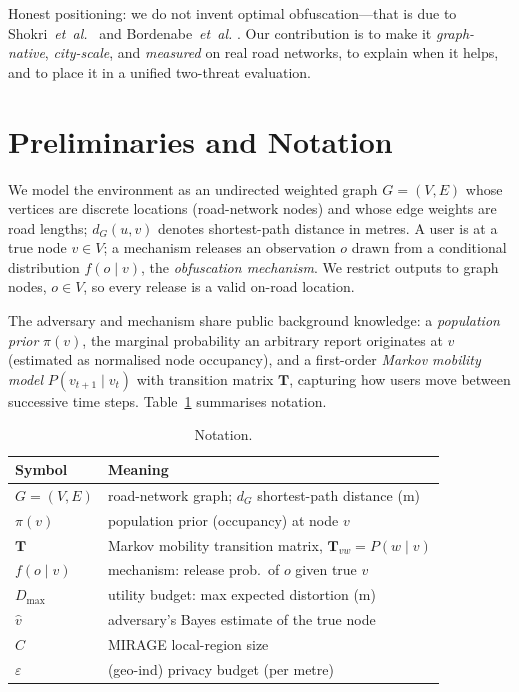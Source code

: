 \documentclass[11pt]{article}
\newcommand{\dG}{d_{G}}
\begin{document}
Honest positioning: we do not invent optimal obfuscation---that is due to
Shokri~\emph{et~al.}~\cite{shokri2012,shokri2015pets} and Bordenabe~\emph{et~al.}
\cite{bordenabe2014}. Our contribution is to make it \emph{graph-native},
\emph{city-scale}, and \emph{measured} on real road networks, to explain when it
helps, and to place it in a unified two-threat evaluation.

\section{Preliminaries and Notation}
\label{sec:prelim}
We model the environment as an undirected weighted graph $G=(V,E)$ whose vertices
are discrete locations (road-network nodes) and whose edge weights are road
lengths; $\dG(u,v)$ denotes shortest-path distance in metres. A user is at a true
node $v\in V$; a mechanism releases an observation $o$ drawn from a conditional
distribution $f(o\mid v)$, the \emph{obfuscation mechanism}. We restrict outputs
to graph nodes, $o\in V$, so every release is a valid on-road location.

The adversary and mechanism share public background knowledge: a \emph{population
prior} $\pi(v)$, the marginal probability an arbitrary report originates at $v$
(estimated as normalised node occupancy), and a first-order \emph{Markov mobility
model} $P(v_{t+1}\mid v_t)$ with transition matrix $\mathbf{T}$, capturing how
users move between successive time steps. Table~\ref{tab:notation} summarises
notation.

\begin{table}[t]\centering
\caption{Notation.}
\label{tab:notation}
\begin{tabular}{ll}
\toprule
Symbol & Meaning \\
\midrule
$G=(V,E)$ & road-network graph; $\dG$ shortest-path distance (m) \\
$\pi(v)$ & population prior (occupancy) at node $v$ \\
$\mathbf{T}$ & Markov mobility transition matrix, $\mathbf{T}_{vw}=P(w\mid v)$ \\
$f(o\mid v)$ & mechanism: release prob.\ of $o$ given true $v$ \\
$D_{\max}$ & utility budget: max expected distortion (m) \\
$\hat v$ & adversary's Bayes estimate of the true node \\
$C$ & MIRAGE local-region size \\
$\varepsilon$ & (geo-ind) privacy budget (per metre) \\
\bottomrule
\end{tabular}
\end{table}
\end{document}
